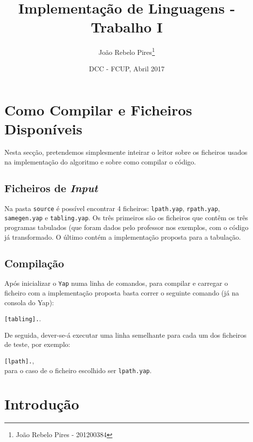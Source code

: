 \documentclass[12pt,a4paper,oneside]{article}
\title{Implementação de Linguagens - Trabalho I}
\author{João Rebelo Pires\footnote{João Rebelo Pires - 201200384}}
\date{DCC - FCUP, Abril 2017}
\begin{document}
\maketitle


\section{Como Compilar e Ficheiros Disponíveis}\label{sec:readme}

Nesta secção, pretendemos simplesmente inteirar o leitor sobre os ficheiros usados na implementação do algoritmo e sobre como compilar o código.

\subsection{Ficheiros de \textit{Input}}\label{subsec:input_descrip}

Na pasta \texttt{source} é possível encontrar 4 ficheiros: \texttt{lpath.yap}, \texttt{rpath.yap}, \texttt{samegen.yap} e \texttt{tabling.yap}. Os três primeiros são os ficheiros que contêm os três programas tabulados (que foram dados pelo professor nos exemplos, com o código já transformado. O último contém a implementação proposta para a tabulação.

\subsection{Compilação}\label{subsec:compile}

Após inicializar o \texttt{Yap} numa linha de comandos, para compilar e carregar o ficheiro com a implementação proposta basta correr o seguinte comando (já na consola do Yap):

\texttt{[tabling].}.

De seguida, dever-se-á executar uma linha semelhante para cada um dos ficheiros de teste, por exemplo:

\texttt{[lpath].},\\
para o caso de o ficheiro escolhido ser \texttt{lpath.yap}.


\section{Introdução}\label{sec:intro}
\end{document}
